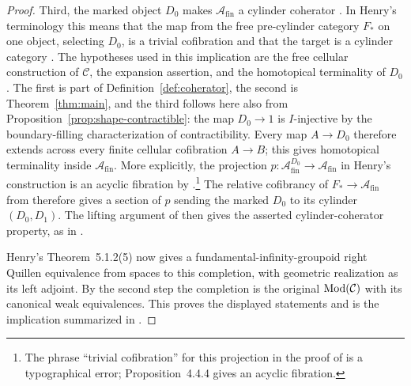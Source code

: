 \begin{proof}
Third, the marked object \(D_0\) makes
\(\mathcal A_{\mathrm{fin}}\) a cylinder coherator
\cite[Corollary~5.3.12]{Henry2016}.  In Henry's terminology this
means that the map from the free pre-cylinder category \(F_*\) on one object,
selecting \(D_0\), is a trivial cofibration and that the target is a
cylinder category \cite[Definition~5.1.1]{Henry2016}.
The hypotheses used in this implication are the
free cellular construction of \(\mathcal C\), the expansion
assertion, and the homotopical terminality of \(D_0\).  The first is
part of Definition~\ref{def:coherator}, the second is
Theorem~\ref{thm:main}, and the third follows here also from
Proposition~\ref{prop:shape-contractible}: the map \(D_0\to1\)
is \(I\)-injective by the boundary-filling characterization of
contractibility.  Every map \(A\to D_0\) therefore extends across
every finite cellular cofibration \(A\to B\); this gives
homotopical terminality inside \(\mathcal A_{\mathrm{fin}}\).
More explicitly, the projection
\(p:\mathcal A_{\mathrm{fin}}^{D_0}\to\mathcal A_{\mathrm{fin}}\)
in Henry's construction is an acyclic fibration by
\cite[Proposition~4.4.4]{Henry2016}.\footnote{The phrase
``trivial cofibration'' for this projection in the proof of
\cite[Lemma~5.3.11]{Henry2016} is a typographical error;
Proposition~4.4.4 gives an acyclic fibration.}
The relative cofibrancy of \(F_*\to\mathcal A_{\mathrm{fin}}\)
from \cite[Proposition~5.3.7]{Henry2016} therefore gives a section
of \(p\) sending the marked \(D_0\) to its cylinder \((D_0,D_1)\).
The lifting argument of \cite[Lemma~5.3.9]{Henry2016} then gives
the asserted cylinder-coherator property, as in
\cite[Lemma~5.3.11 and Corollary~5.3.12]{Henry2016}.

Henry's Theorem~5.1.2(5) now gives a fundamental-infinity-groupoid
right Quillen equivalence from spaces to this completion, with
geometric realization as its left adjoint.  By the second step the
completion is the original \(\operatorname{Mod}(\mathcal C)\) with its canonical
weak equivalences.  This proves the displayed statements and is the
implication summarized in \cite[Corollary~5.3.13]{Henry2016}.
\end{proof}
